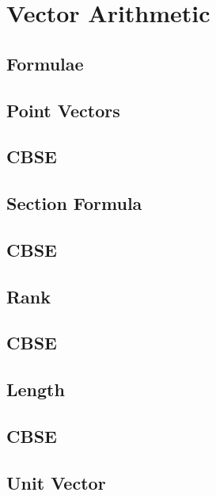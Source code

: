 \documentclass[journal]{IEEEtran}
\begin{document}
\newpage


\tableofcontents

\newpage
\onecolumn


\renewcommand{\thetable}{\theenumi}


\section{Vector Arithmetic}
\subsection{Formulae}

\subsection{Point Vectors}

\subsection{CBSE}

\subsection{Section Formula}

\subsection{CBSE}

\subsection{Rank}

\subsection{CBSE}

\subsection{Length}

\subsection{CBSE}

\subsection{Unit Vector}

\end{document}
